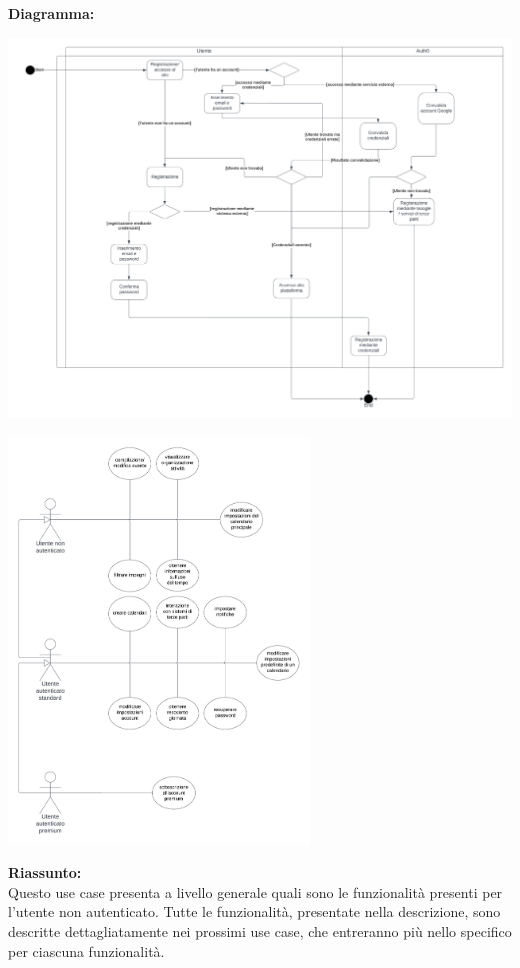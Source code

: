 \begin{listaPersonale}[UC]{}
    \textbf{Diagramma:}
    \begin{center}
        \includegraphics[width=1\textwidth, height = 0.4\textheight]{img/Diagrammi/DS/DS_AccessoRegistrazione.png}
    \end{center}


    \newpage


    \begin{center}
        \includegraphics[width=0.6\textwidth, height = 0.5\textheight]{img/Diagrammi/UseCases/FunzionalitaUtenti.png}
    \end{center}
    \begin{listaPersonale2} [UC] {}
        \textbf{Riassunto:} \\
        Questo use case presenta a livello generale quali sono le funzionalità presenti per l'utente non autenticato. Tutte le funzionalità, presentate nella descrizione, sono descritte dettagliatamente nei prossimi use case, che entreranno più nello specifico per ciascuna funzionalità.


\end{listaPersonale2}
\end{listaPersonale}
